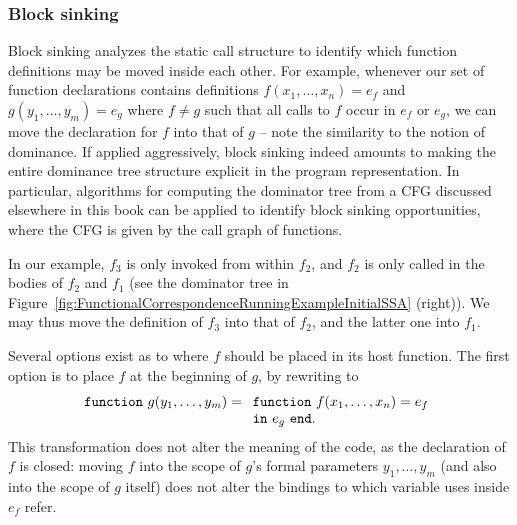 \subsubsection{Block sinking}
\label{section:Part1:Semantics:lambdaDropping:blockSinking}
Block sinking analyzes the static call structure to identify which
function definitions may be moved inside each other. For example,
whenever our set of function declarations contains definitions $f
(x_1,\ldots,x_n) = e_f$ and $ g (y_1,\ldots,y_m) = e_g$ where $f \neq
g$ such that all calls to $f$ occur in $e_f$ or $e_g$, we can move the
declaration for $f$ into that of $g$ -- note the similarity to the
notion of dominance. If applied aggressively, block sinking indeed
amounts to making the entire dominance tree structure explicit in the
program representation. In particular, algorithms for computing the
dominator tree from a CFG discussed elsewhere in this book can be
applied to identify block sinking opportunities, where the CFG is
given by the call graph of functions.

In our example, $f_3$ is only invoked from within $f_2$, and $f_2$ is
only called in the bodies of $f_2$ and $f_1$ (see the dominator tree
in Figure~\ref{fig:FunctionalCorrespondenceRunningExampleInitialSSA}
(right)).  We may thus move the definition of $f_3$ into that of
$f_2$, and the latter one into $f_1$.

Several options exist as to where $f$ should be placed in its host
function. The first option is to place $f$ at the beginning of $g$,
by rewriting to 
$$\mathtt{function}\ g(y_1,\ldots,y_m) =
\begin{array}[t]{l} 
  \mathtt{function}\ f(x_1,\ldots,x_n) = e_f\\
  \mathtt{in}\ e_g\ \mathtt{end}.
\end{array}
$$ This transformation does not alter the meaning of the code, as the
declaration of $f$ is closed: moving $f$ into the scope of $g$'s
formal parameters $y_1,\ldots,y_m$ (and also into the scope of $g$
itself) does not alter the bindings to which variable uses inside
$e_f$ refer.

